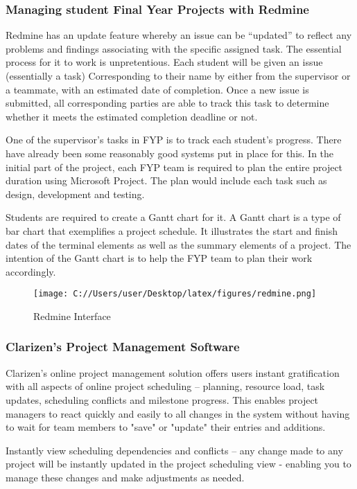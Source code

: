 \documentclass{article}
\begin{document}
\subsubsection{Managing student Final Year Projects with Redmine}
\par Redmine has an update feature whereby an issue can be “updated” to reflect any problems and findings associating with the specific assigned task. The essential process for it to work is unpretentious. Each student will be given an issue (essentially a task) Corresponding to their name by either from the supervisor or a teammate, with an estimated date of completion. Once a new issue is submitted, all corresponding parties are able to track this task to determine whether it meets the estimated completion deadline or not.\cite{read}
\par One of the supervisor’s tasks in FYP is to track each student’s progress. There have already been some reasonably good systems put in place for this. In the initial part of the project, each FYP team is required to plan the entire project duration using Microsoft Project. The plan would include each task such as design, development and testing.
\par Students are required to create a Gantt chart for it. A Gantt chart is a type of bar chart that exemplifies a project schedule. It illustrates the start and finish dates of the terminal elements as well as the summary elements of a project. The intention of the Gantt chart is to help the FYP team to plan their work accordingly.
 \begin{figure}[h!]
  \texttt{[image: C://Users/user/Desktop/latex/figures/redmine.png]}
  \caption{Redmine Interface}
  \label{fig:redmine}
\end{figure}
\subsubsection{Clarizen's Project Management Software}
\par Clarizen's online project management solution offers users instant gratification with all aspects of online project scheduling – planning, resource load, task updates, scheduling conflicts and milestone progress. This enables project managers to react quickly and easily to all changes in the system without having to wait for team members to "save" or "update" their entries and
additions.\cite{khazaliprogress}
\par Instantly view scheduling dependencies and conflicts – any change made to any project will be instantly updated in the project scheduling view - enabling you to manage these changes and make adjustments as needed.
\end{document}
